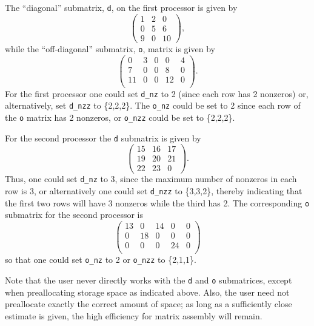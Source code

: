 The ``diagonal'' submatrix, {\tt d}, on the first processor is given by 
{\small
\[
\left( \begin{array}{ccc} 
1  & 2  & 0  \\
0  & 5  & 6  \\
9  & 0  & 10 
\end{array} \right),
\]
}
while the ``off-diagonal'' submatrix, {\tt o}, matrix is given by 
{\small
\[
\left( \begin{array}{ccccc} 
 0  & 3  & 0   & 0  & 4  \\
 7  & 0  & 0   & 8  & 0  \\
 11 & 0  & 0   & 12 & 0  \\
\end{array} \right).
\]
}
For the first processor one could set {\tt d\_nz} to 2 (since each
row has 2 nonzeros) or, alternatively, set {\tt d\_nzz} to \{2,2,2\}.
The {\tt o\_nz} could be set to 2 since each row of the {\tt o} matrix
has 2 nonzeros, or {\tt o\_nzz} could be set to \{2,2,2\}.

For the second processor the {\tt d} submatrix is given by 
{\small
\[
\left( \begin{array}{cccccccccc} 
 15 & 16 & 17 \\
 19 & 20 & 21 \\
 22 & 23 & 0  
\end{array} \right) .
\]
}
Thus, one could set {\tt d\_nz} to 3, since the maximum number of
nonzeros in each row is 3, or alternatively one could set {\tt d\_nzz} to
\{3,3,2\}, thereby indicating that the first two rows will have 3
nonzeros while the third has 2. The corresponding {\tt o} submatrix for the
second processor is
{\small
\[
\left( \begin{array}{cccccccccc} 
13 & 0  & 14 &  0  & 0  \\
0  & 18 & 0  &  0  & 0 \\
0  & 0  & 0  &  24 & 0 \\
\end{array} \right)
\]
}
so that one could set {\tt o\_nz} to 2 or {\tt o\_nzz} to \{2,1,1\}.

Note that the user never directly works with the {\tt d} and {\tt o}
submatrices, except when preallocating storage space as indicated above.
Also, the user need not preallocate exactly the correct amount of
space; as long as a sufficiently close estimate is given, the high
efficiency for matrix assembly will remain.  

